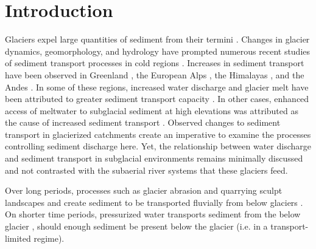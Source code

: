 \documentclass[11pt]{article}
\begin{document}
% 
% 



\section{Introduction}
\label{sect:intro}


Glaciers expel large quantities of sediment from their termini \citep{hallet1996}.
Changes in glacier dynamics, geomorphology, and hydrology  have prompted numerous  recent studies of  sediment transport processes in cold regions \citep[e.g.][]{zhang2022}.
Increases in sediment transport  have been observed in Greenland \citep{bendixen2017}, the European Alps \citep{costa2017}, the Himalayas \citep{li2021}, and the Andes \citep{vergara2022}.
In some of these regions, increased water discharge and glacier melt have been attributed to greater sediment transport capacity \citep{bendixen2017,costa2017,li2021}.
In other cases, enhanced access of meltwater to subglacial sediment at high elevations was attributed as the cause of increased sediment transport \citep{delaney2020,vergara2022}.
Observed changes to sediment transport in glacierized catchments create an imperative to examine the processes controlling sediment discharge here. 
Yet, the relationship between water discharge and sediment transport in subglacial environments remains minimally discussed and not contrasted with the subaerial river systems that these glaciers feed.

Over long periods, processes such as glacier abrasion and quarrying sculpt landscapes and create sediment to be transported fluvially from below glaciers \citep[c.f.][]{hallet1979,iverson2012,ugelvig2018}. 
On shorter time periods, pressurized water transports sediment from the below glacier \citep{walder1994,creyts2013,beaud2018}, should enough sediment be present below the glacier (i.e. in a transport-limited regime).
\end{document}
